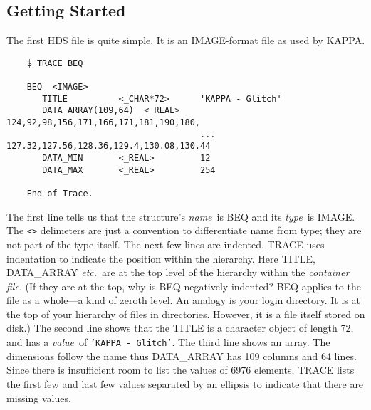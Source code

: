 \subsection{Getting Started}
The first HDS file is quite simple.  It is an IMAGE-format file as used
by KAPPA.
\small
\begin{verbatim}
    $ TRACE BEQ
  
    BEQ  <IMAGE>
       TITLE          <_CHAR*72>      'KAPPA - Glitch'
       DATA_ARRAY(109,64)  <_REAL>    124,92,98,156,171,166,171,181,190,180,
                                      ... 127.32,127.56,128.36,129.4,130.08,130.44
       DATA_MIN       <_REAL>         12
       DATA_MAX       <_REAL>         254
                                                                              
    End of Trace.
\end{verbatim}
\normalsize
The first line tells us that the structure's {\em name}\ is BEQ and 
its {\em type}\ is IMAGE.  The {\tt <>} delimeters are just a convention
to differentiate name from type; they are not part of the type itself.
The next few lines are indented.  {\small TRACE} uses indentation to
indicate the position within the hierarchy.  Here TITLE, DATA\_ARRAY
{\it etc.}\ are at the top level of the hierarchy within the {\em container 
file}.  (If they are at the top, why is BEQ negatively indented?
BEQ applies to the file as a whole---a kind of zeroth level.  An analogy
is your login directory.  It is at the top of your hierarchy of files
in directories.  However, it is a file itself stored on disk.)  The
second line shows that the TITLE is a character object of length 72, and
has a {\em value}\ of {\tt 'KAPPA - Glitch'}.  The third line shows an
array.  The dimensions follow the name thus DATA\_ARRAY has 109 columns
and 64 lines.  Since there is insufficient room to list the values of
6976 elements, {\small TRACE} lists the first few and last few values
separated by an ellipsis to indicate that there are missing values.

